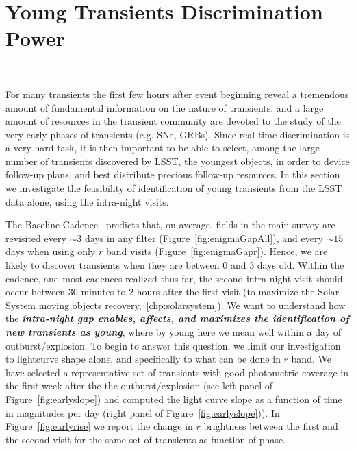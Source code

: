 
%
%
%
%
%
%
%
%

\section{Young Transients Discrimination Power}
\def\secname{transientsAge}\label{sec:\secname}


~ %

For many transients the first few hours after event beginning reveal a tremendous amount of fundamental information on the nature of transients, and a large amount of resources in the transient community are devoted to the study of the very early phases of transients (e.g. SNe, GRBs). Since real time discrimination is a very hard task, it is then important to be able to select, among the large number of transients discovered by LSST, the youngest objects, in order to device follow-up plans, and best distribute precious follow-up resources. In this section we investigate the feasibility of identification of young transients from the LSST data alone, using the intra-night visits.

The Baseline Cadence~ predicts that, on average, fields in the main survey are revisited every $\sim3$ days in any filter (Figure~\ref{fig:enigmaGapAll}), and every $\sim15$ days when using only $r$ band visits (Figure~\ref{fig:enigmaGapr}).  Hence, we are likely to discover transients when they are between 0 and 3 days old. Within the~ cadence, and most cadences realized thus far, the second intra-night visit should occur between 30 minutes to 2 hours after the first visit (to maximize the Solar System moving objects recovery,~\ref{chp:solarsystem}). We want to understand how the {\bf\emph{intra-night gap enables, affects, and maximizes the identification of new transients as young}}, where by young here we mean well within a day of outburst/explosion.
To begin to answer this question, we limit our investigation to lightcurve shape alone, and specifically to what can be done in $r$ band. We have selected a representative set of transients with good photometric coverage in the first week after the the outburst/explosion (see left panel of Figure~\ref{fig:earlyslope}) and computed the light curve slope as a function of time in magnitudes per day (right panel of Figure~\ref{fig:earlyslope})). In Figure~\ref{fig:earlyrise} we report the change in $r$ brightness between the first and the second visit for the same set of transients as function of phase.

